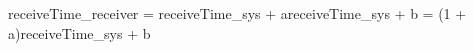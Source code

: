 receiveTime_{receiver} = receiveTime_{sys} + a{\cdot}receiveTime_{sys} + b = (1 + a){\cdot}receiveTime_{sys} + b